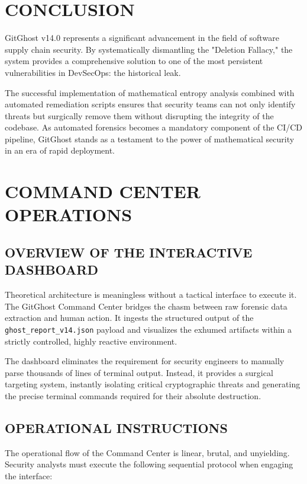\documentclass[12pt, a4paper, oneside]{report}
\begin{document}
\chapter{CONCLUSION}
GitGhost v14.0 represents a significant advancement in the field of software supply chain security. By systematically dismantling the "Deletion Fallacy," the system provides a comprehensive solution to one of the most persistent vulnerabilities in DevSecOps: the historical leak. 

The successful implementation of mathematical entropy analysis combined with automated remediation scripts ensures that security teams can not only identify threats but surgically remove them without disrupting the integrity of the codebase. As automated forensics becomes a mandatory component of the CI/CD pipeline, GitGhost stands as a testament to the power of mathematical security in an era of rapid deployment.

\chapter{COMMAND CENTER OPERATIONS}

\section{OVERVIEW OF THE INTERACTIVE DASHBOARD}
Theoretical architecture is meaningless without a tactical interface to execute it. The GitGhost Command Center bridges the chasm between raw forensic data extraction and human action. It ingests the structured output of the \texttt{ghost\_report\_v14.json} payload and visualizes the exhumed artifacts within a strictly controlled, highly reactive environment. 

The dashboard eliminates the requirement for security engineers to manually parse thousands of lines of terminal output. Instead, it provides a surgical targeting system, instantly isolating critical cryptographic threats and generating the precise terminal commands required for their absolute destruction.

\section{OPERATIONAL INSTRUCTIONS}
The operational flow of the Command Center is linear, brutal, and unyielding. Security analysts must execute the following sequential protocol when engaging the interface:
\end{document}
